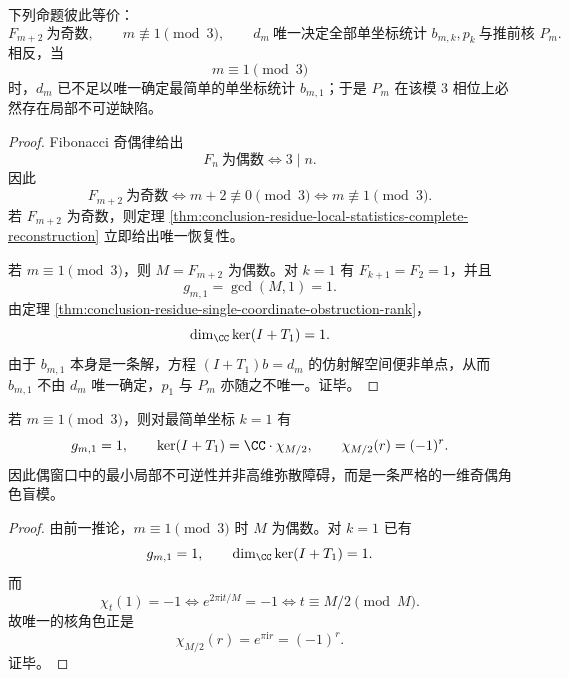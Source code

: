 \begin{corollary}[模三相位与局部可逆性的精确二分]\label{cor:conclusion-residue-mod3-local-reversibility-phase-transition}
下列命题彼此等价：
\[
F_{m+2}\ \text{为奇数},
\qquad
m\not\equiv 1\pmod 3,
\qquad
d_m\ \text{唯一决定全部单坐标统计 }b_{m,k},p_k\ \text{与推前核 }P_m.
\]
相反，当
\[
m\equiv 1\pmod 3
\]
时，\(d_m\) 已不足以唯一确定最简单的单坐标统计 \(b_{m,1}\)；于是 \(P_m\) 在该模 \(3\) 相位上必然存在局部不可逆缺陷。
\end{corollary}
\begin{proof}
Fibonacci 奇偶律给出
\[
F_n\ \text{为偶数}\iff 3\mid n.
\]
因此
\[
F_{m+2}\ \text{为奇数}
\iff
m+2\not\equiv 0\pmod 3
\iff
m\not\equiv 1\pmod 3.
\]
若 \(F_{m+2}\) 为奇数，则定理 \ref{thm:conclusion-residue-local-statistics-complete-reconstruction} 立即给出唯一恢复性。

若 \(m\equiv 1\pmod 3\)，则 \(M=F_{m+2}\) 为偶数。对 \(k=1\) 有 \(F_{k+1}=F_2=1\)，并且
\[
g_{m,1}=\gcd(M,1)=1.
\]
由定理 \ref{thm:conclusion-residue-single-coordinate-obstruction-rank}，
\[
\dim_{\CC}\ker(I+T_1)=1.
\]
由于 \(b_{m,1}\) 本身是一条解，方程 \((I+T_1)b=d_m\) 的仿射解空间便非单点，从而 \(b_{m,1}\) 不由 \(d_m\) 唯一确定，\(p_1\) 与 \(P_m\) 亦随之不唯一。证毕。
\end{proof}

\begin{corollary}[偶窗口中的普适一维奇偶盲模]\label{cor:conclusion-residue-even-window-universal-parity-blind-mode}
若 \(m\equiv 1\pmod 3\)，则对最简单坐标 \(k=1\) 有
\[
g_{m,1}=1,
\qquad
\ker(I+T_1)=\CC\cdot \chi_{M/2},
\qquad
\chi_{M/2}(r)=(-1)^r.
\]
因此偶窗口中的最小局部不可逆性并非高维弥散障碍，而是一条严格的一维奇偶角色盲模。
\end{corollary}
\begin{proof}
由前一推论，\(m\equiv 1\pmod 3\) 时 \(M\) 为偶数。对 \(k=1\) 已有
\[
g_{m,1}=1,
\qquad
\dim_{\CC}\ker(I+T_1)=1.
\]
而
\[
\chi_t(1)=-1
\iff
e^{2\pi \mathrm{i}t/M}=-1
\iff
t\equiv M/2\pmod M.
\]
故唯一的核角色正是
\[
\chi_{M/2}(r)=e^{\pi \mathrm{i}r}=(-1)^r.
\]
证毕。
\end{proof}

